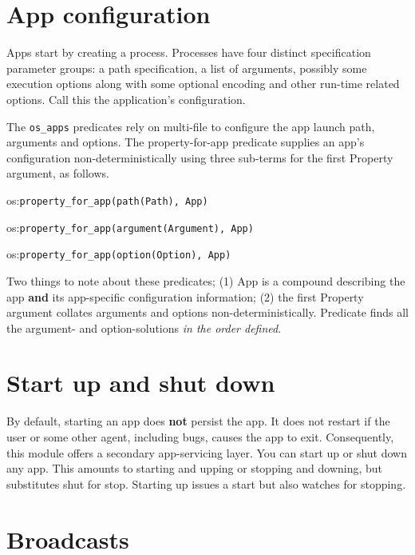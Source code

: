 \section{App configuration}

Apps start by creating a process. Processes have four distinct
specification parameter groups: a path specification, a list of
arguments, possibly some execution options along with some optional
encoding and other run-time related options. Call this the
application's configuration.

The \verb$os_apps$ predicates rely on multi-file  to
configure the app launch path, arguments and options. The
property-for-app predicate supplies an app's configuration
non-deterministically using three sub-terms for the first Property
argument, as follows.

\begin{shortlist}
    \item os:\verb$property_for_app(path(Path), App)$
    \item os:\verb$property_for_app(argument(Argument), App)$
    \item os:\verb$property_for_app(option(Option), App)$
\end{shortlist}

Two things to note about these predicates; (1) App is a compound
describing the app \textbf{and} its app-specific configuration information;
(2) the first Property argument collates arguments and options
non-deterministically. Predicate  finds all the argument-
and option-solutions \textit{in the order defined}.

\section{Start up and shut down}

By default, starting an app does \textbf{not} persist the app. It does not
restart if the user or some other agent, including bugs, causes the
app to exit. Consequently, this module offers a secondary
app-servicing layer. You can start up or shut down any app. This
amounts to starting and upping or stopping and downing, but
substitutes shut for stop. Starting up issues a start but also
watches for stopping.

\section{Broadcasts}

